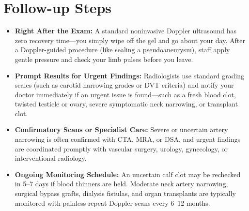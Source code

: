 \section{Follow-up Steps}
\begin{itemize}
\item \textbf{Right After the Exam:} A standard noninvasive Doppler ultrasound has zero recovery time---you simply wipe off the gel and go about your day. After a Doppler-guided procedure (like sealing a pseudoaneurysm), staff apply gentle pressure and check your limb pulses before you leave.
\item \textbf{Prompt Results for Urgent Findings:} Radiologists use standard grading scales (such as carotid narrowing grades or DVT criteria) and notify your doctor immediately if an urgent issue is found---such as a fresh blood clot, twisted testicle or ovary, severe symptomatic neck narrowing, or transplant clot.
\item \textbf{Confirmatory Scans or Specialist Care:} Severe or uncertain artery narrowing is often confirmed with CTA, MRA, or DSA, and urgent findings are coordinated promptly with vascular surgery, urology, gynecology, or interventional radiology.
\item \textbf{Ongoing Monitoring Schedule:} An uncertain calf clot may be rechecked in 5--7 days if blood thinners are held. Moderate neck artery narrowing, surgical bypass grafts, dialysis fistulas, and organ transplants are typically monitored with painless repeat Doppler scans every 6--12 months.
\end{itemize}

